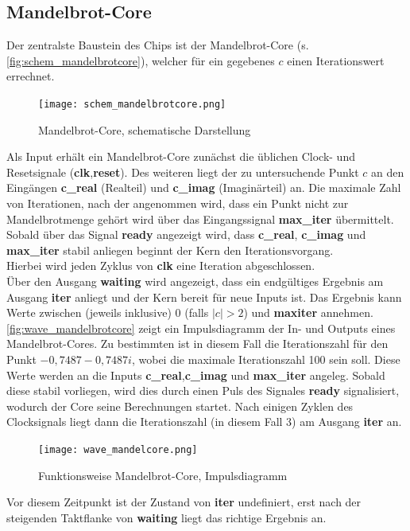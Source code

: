 \documentclass[a4paper,12pt,onesided]{report}
\begin{document}
\subsection{Mandelbrot-Core}
\label{subsec:mandelcore}
Der zentralste Baustein des Chips ist der Mandelbrot-Core (s. \autoref{fig:schem_mandelbrotcore}), welcher für ein gegebenes $c$ einen Iterationswert errechnet.
\begin{figure}[H]
	\centering
	\texttt{[image: schem\_mandelbrotcore.png]}
	\caption{Mandelbrot-Core, schematische Darstellung}
	\label{fig:schem_mandelbrotcore}
\end{figure}
Als Input erhält ein Mandelbrot-Core zunächst die üblichen Clock- und Resetsignale (\textbf{clk},\textbf{reset}).
Des weiteren liegt der zu untersuchende Punkt $c$ an den Eingängen \textbf{c\_real} (Realteil) und \textbf{c\_imag} (Imaginärteil) an.
Die maximale Zahl von Iterationen, nach der angenommen wird, dass ein Punkt nicht zur Mandelbrotmenge gehört wird über das Eingangssignal \textbf{max\_iter} übermittelt.\\
Sobald über das Signal \textbf{ready} angezeigt wird, dass \textbf{c\_real}, \textbf{c\_imag} und \textbf{max\_iter} stabil anliegen beginnt der Kern den Iterationsvorgang.\\
Hierbei wird jeden Zyklus von \textbf{clk} eine Iteration abgeschlossen.\\
Über den Ausgang \textbf{waiting} wird angezeigt, dass ein endgültiges Ergebnis am Ausgang \textbf{iter} anliegt und der Kern bereit für neue Inputs ist.
Das Ergebnis kann Werte zwischen (jeweils inklusive) 0 (falls $|c|>2$) und \textbf{maxiter} annehmen.\\
\autoref{fig:wave_mandelbrotcore} zeigt ein Impulsdiagramm der In- und Outputs eines Mandelbrot-Cores.
Zu bestimmten ist in diesem Fall die Iterationszahl für den Punkt $-0,7487-0,7487i$, wobei die maximale Iterationszahl 100 sein soll.
Diese Werte werden an die Inputs \textbf{c\_real},\textbf{c\_imag} und \textbf{max\_iter} angeleg.
Sobald diese stabil vorliegen, wird dies durch einen Puls des Signales \textbf{ready} signalisiert, wodurch der Core seine Berechnungen startet.
Nach einigen Zyklen des Clocksignals liegt dann die Iterationszahl (in diesem Fall 3) am Ausgang \textbf{iter} an.
\begin{figure}[H]
	\centering
	\texttt{[image: wave\_mandelcore.png]}
	\caption{Funktionsweise Mandelbrot-Core, Impulsdiagramm}
	\label{fig:wave_mandelbrotcore}
\end{figure}
Vor diesem Zeitpunkt ist der Zustand von \textbf{iter} undefiniert, erst nach der steigenden Taktflanke von \textbf{waiting} liegt das richtige Ergebnis an.
\end{document}
